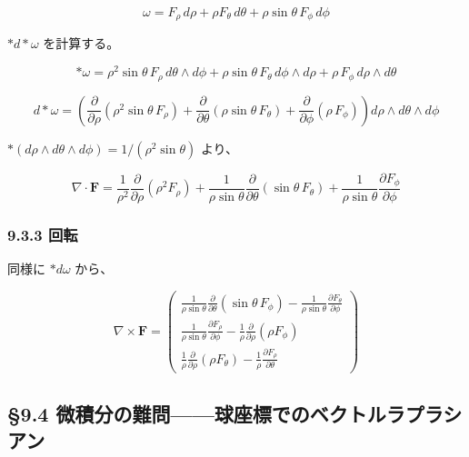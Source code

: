 \documentclass[a4paper,12pt,openany]{book}
\begin{document}
\[\omega = F_\rho\,d\rho + \rho F_\theta\,d\theta + \rho\sin\theta\,F_\phi\,d\phi\]

\(\ast d\ast\omega\) を計算する。

\[\ast\omega = \rho^2\sin\theta\,F_\rho\,d\theta\wedge d\phi + \rho\sin\theta\,F_\theta\,d\phi\wedge d\rho + \rho\,F_\phi\,d\rho\wedge d\theta\]

\[d\ast\omega = \left(\frac{\partial}{\partial\rho}(\rho^2\sin\theta\,F_\rho) + \frac{\partial}{\partial\theta}(\rho\sin\theta\,F_\theta) + \frac{\partial}{\partial\phi}(\rho\,F_\phi)\right) d\rho\wedge d\theta\wedge d\phi\]

\(\ast(d\rho\wedge d\theta\wedge d\phi) = 1/(\rho^2\sin\theta)\) より、

\[\nabla \cdot \mathbf{F} = \frac{1}{\rho^2}\frac{\partial}{\partial\rho}(\rho^2 F_\rho) + \frac{1}{\rho\sin\theta}\frac{\partial}{\partial\theta}(\sin\theta\,F_\theta) + \frac{1}{\rho\sin\theta}\frac{\partial F_\phi}{\partial\phi}\]

\hypertarget{ux56deux8ee2-3}{%
\subsubsection{9.3.3 回転}\label{ux56deux8ee2-3}}

同様に \(\ast d\omega\) から、

\[\nabla \times \mathbf{F} = \begin{pmatrix}
\frac{1}{\rho\sin\theta}\frac{\partial}{\partial\theta}(\sin\theta\,F_\phi) - \frac{1}{\rho\sin\theta}\frac{\partial F_\theta}{\partial\phi} \\[0.3em]
\frac{1}{\rho\sin\theta}\frac{\partial F_\rho}{\partial\phi} - \frac{1}{\rho}\frac{\partial}{\partial\rho}(\rho F_\phi) \\[0.3em]
\frac{1}{\rho}\frac{\partial}{\partial\rho}(\rho F_\theta) - \frac{1}{\rho}\frac{\partial F_\rho}{\partial\theta}
\end{pmatrix}\]

\par\vspace{0.35em}\par

\hypertarget{ux5faeux7a4dux5206ux306eux96e3ux554fux7403ux5ea7ux6a19ux3067ux306eux30d9ux30afux30c8ux30ebux30e9ux30d7ux30e9ux30b7ux30a2ux30f3}{%
\subsection{§9.4
微積分の難問——球座標でのベクトルラプラシアン}\label{ux5faeux7a4dux5206ux306eux96e3ux554fux7403ux5ea7ux6a19ux3067ux306eux30d9ux30afux30c8ux30ebux30e9ux30d7ux30e9ux30b7ux30a2ux30f3}}
\end{document}
